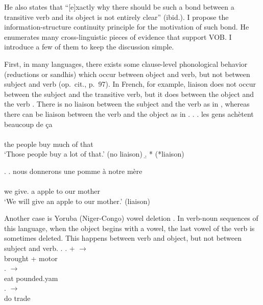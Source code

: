 He also states that
``[e]xactly why there should be such a bond between a transitive verb and its object is not entirely clear'' (ibid.).
I propose the information-structure continuity principle
for the motivation of such bond.
He enumerates many cross-linguistic pieces of evidence that support VOB.
I introduce a few of them to keep the discussion simple.

First,
in many languages,
there exists some clause-level phonological behavior
(reductions or sandhis) which occur between object and verb,
but not between subject and verb (op.~cit., p.~97).
In French, for example,
liaison does not occur between the subject and the transitive verb,
but it does between the object and the verb \cite[see also][]{selkirk72}.
There is no liaison between the subject  and the verb  as in \Next,
whereas there can be liaison between the verb  and the object  as in \NNext.
%
\ex.
 \a. \glll
	les gens ach\`{e}tent beaucoup de \c{c}a \\
	      \\
	the people buy much of that \\
	`Those people buy a lot of that.' \hfill{(no liaison)}
 \b. *      
 		 \hfill{(*liaison)}

\ex.
 \a. \glll
	nous donnerons une pomme \`a notre m\`ere \\
  	       \\
	we give. a apple to our mother \\
	`We will give an apple to our mother.'
	\hfill{(liaison)}
\begin{flushright}
\cite[][pp.~98-99, transcription modified based on standard French]{tomlin86}
\end{flushright}

Another case is Yoruba (Niger-Congo) vowel deletion \cite[from][]{bamgbose64}.
In verb-noun sequences of this language,
when the object begins with a vowel,
the last vowel of the verb is sometimes deleted.
This happens between verb and object, but not between subject and verb.
%
\ex.
 \ag.  +  $\to$  \\
		brought + motor \\
 \bg.   $\to$  \\
 		eat pounded.yam \\
 \bg.   $\to$  \\
 		do trade \\
		\hfill{\cite[][pp.~29--30]{bamgbose64}}

